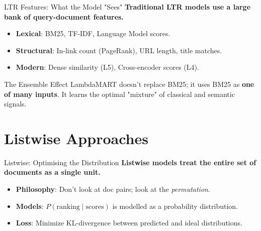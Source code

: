 \documentclass[aspectratio=169]{beamer}
\newif\ifanimated
\newcommand{\cpause}{\ifanimated\pause\fi}
\begin{document}
\begin{frame}{LTR Features: What the Model "Sees"}
\textbf{Traditional LTR models use a large bank of query-document features.}

\vspace{0.8em}
\begin{itemize}
    \item \textbf{Lexical}: BM25, TF-IDF, Language Model scores.
    \item \textbf{Structural}: In-link count (PageRank), URL length, title matches.
    \item \textbf{Modern}: Dense similarity (L5), Cross-encoder scores (L4).
\end{itemize}\cpause

\vspace{1em}
\cpause
\begin{alertblock}{The Ensemble Effect}
LambdaMART doesn't replace BM25; it uses BM25 as \textbf{one of many inputs}. It learns the optimal "mixture" of classical and semantic signals.
\end{alertblock}
\end{frame}

\section{Listwise Approaches}

\begin{frame}[plain]
\sectionpage
\end{frame}

\begin{frame}{Listwise: Optimising the Distribution}
\textbf{Listwise models treat the entire set of documents as a single unit.}

\vspace{0.8em}
\begin{itemize}
    \item \textbf{Philosophy}: Don't look at doc pairs; look at the \textit{permutation}.
    \item \textbf{Models}: $P(\text{ranking} \mid \text{scores})$ is modelled as a probability distribution.
    \item \textbf{Loss}: Minimize KL-divergence between predicted and ideal distributions.
\end{itemize}\cpause

\vspace{0.5em}
\begin{center}

\end{center}
\end{frame}
\end{document}
